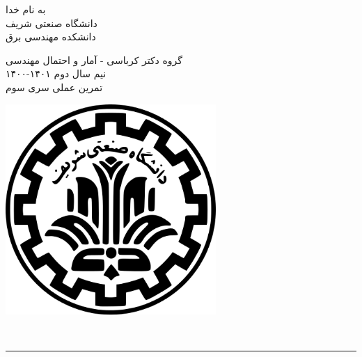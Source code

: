 \documentclass[a4paper]{article}
\begin{document}
\begin{minipage}{0.6\textwidth}
\begin{bf}
\begin{center}
	به نام خدا\\
	\vspace{0.25cm}
	دانشگاه صنعتی شریف\\
	\vspace{0.25cm}
	دانشکده مهندسی برق\\
	\vspace{0.5cm}

\large
گروه دکتر کرباسی - آمار و احتمال مهندسی \\
نیم سال دوم
۱۴۰۱-۱۴۰۰\\
\Large
\vspace{0.4cm}
تمرین عملی سری سوم \\
\end{center}
\end{bf}
\normalsize
\end{minipage} \hfill
\begin{minipage}{0.35\textwidth}
\begin{flushleft}
\includegraphics[width=0.6\textwidth]{Shariflogo.png}\\ \large
\end{flushleft}

 \end{minipage}
\\

\rule[0.1\baselineskip]{\textwidth}{1.5pt}

\large
\end{document}
